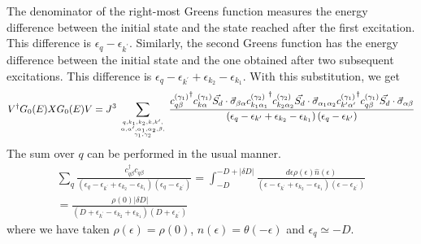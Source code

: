 The denominator of the right-most Greens function measures the energy difference between the initial state and the state reached after the first excitation. This difference is \(\epsilon_q - \epsilon_{k^\prime}\). Similarly, the second Greens function has the energy difference between the initial state and the one obtained after two subsequent excitations. This difference is \(\epsilon_q - \epsilon_{k^\prime} + \epsilon_{k_2} - \epsilon_{k_1}\). With this substitution, we get 
\begin{equation}\begin{aligned}
	V^\dagger G_0(E)XG_0(E)V = J^3\sum_{q,k_1,k_2,k,k^\prime,\atop{\alpha,\alpha^\prime,\alpha_1,\alpha_2,\beta,\atop{\gamma_1,\gamma_2}}}\frac{{c^{(\gamma_1)}_{q\beta}}^\dagger {c^{(\gamma_1)}_{k\alpha}}\vec{S_d}\cdot\vec{\sigma}_{\beta \alpha} {c^{(\gamma_2)}_{k_1 \alpha_1}}^\dagger{c^{(\gamma_2)}_{k_2 \alpha_2}}\vec{S_d}\cdot\vec{\sigma}_{\alpha_1 \alpha_2} {c^{(\gamma_1)}_{k^\prime\alpha^\prime}}^\dagger {c^{(\gamma_1)}_{q\beta}}\vec{S_d}\cdot\vec{\sigma}_{\alpha \beta}}{\left(\epsilon_q - \epsilon_{k^\prime} + \epsilon_{k_2} - \epsilon_{k_1}\right)\left(\epsilon_q - \epsilon_{k^\prime}\right)}
\end{aligned}\end{equation}
The sum over \(q\) can be performed in the usual manner.
\begin{equation}\begin{aligned}
	\sum_q \frac{c^\dagger_{q\beta}c_{q\beta}}{\left(\epsilon_q - \epsilon_{k^\prime} + \epsilon_{k_2} - \epsilon_{k_1}\right)\left(\epsilon_q - \epsilon_{k^\prime}\right)} = \int_{-D}^{-D + |\delta D|} \frac{d\epsilon \rho(\epsilon)\hat n(\epsilon)}{\left(\epsilon - \epsilon_{k^\prime} + \epsilon_{k_2} - \epsilon_{k_1}\right)\left(\epsilon - \epsilon_{k^\prime}\right) }\\
	= \frac{\rho(0) |\delta D|}{\left(D + \epsilon_{k^\prime} - \epsilon_{k_2} + \epsilon_{k_1}\right)\left(D + \epsilon_{k^\prime}\right)}
\end{aligned}\end{equation}
where we have taken \(\rho(\epsilon) = \rho(0)\), \(\hat n(\epsilon) = \theta(-\epsilon)\) and \(\epsilon_q \simeq -D\). 

